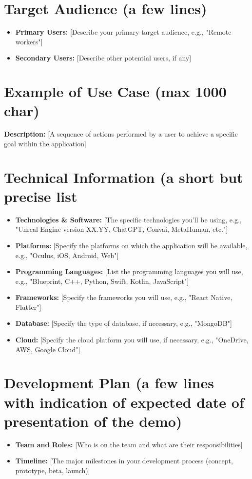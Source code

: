 \documentclass{article}
\begin{document}
\section{Target Audience (a few lines)}
\begin{itemize}
    \item \textbf{Primary Users:} [Describe your primary target audience, e.g., "Remote workers"]
    \item \textbf{Secondary Users:} [Describe other potential users, if any]
\end{itemize}

\section{Example of Use Case (max 1000 char)}
\textbf{Description:} [A sequence of actions performed by a user to achieve a specific goal within the application]

\section{Technical Information (a short but precise list}
\begin{itemize}
    \item \textbf{Technologies \& Software:} [The specific technologies you'll be using, e.g., "Unreal Engine version XX.YY, ChatGPT, Convai, MetaHuman, etc."]
    \item \textbf{Platforms:} [Specify the platforms on which the application will be available, e.g., "Oculus, iOS, Android, Web"]
    \item \textbf{Programming Languages:} [List the programming languages you will use, e.g., "Blueprint, C++, Python, Swift, Kotlin, JavaScript"]
    \item \textbf{Frameworks:} [Specify the frameworks you will use, e.g., "React Native, Flutter"]
    \item \textbf{Database:} [Specify the type of database, if necessary, e.g., "MongoDB"]
    \item \textbf{Cloud:} [Specify the cloud platform you will use, if necessary, e.g., "OneDrive, AWS, Google Cloud"]
\end{itemize}

\section{Development Plan (a few lines with indication of expected date of presentation of the demo)}
\begin{itemize}
    \item \textbf{Team and Roles:} [Who is on the team and what are their responsibilities]
    \item \textbf{Timeline:} [The major milestones in your development process (concept, prototype, beta, launch)]
\end{itemize}
\end{document}
